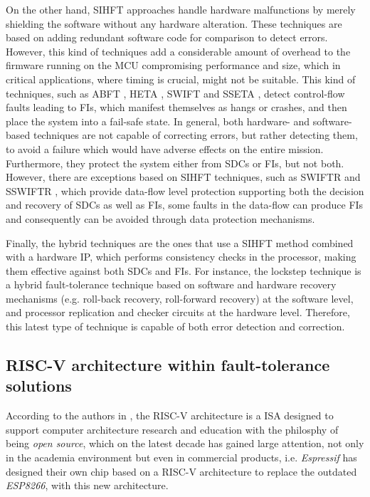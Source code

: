 \documentclass[10pt, a4paper]{report}
\begin{document}
On the other hand, \acrfull{SIHFT} approaches handle hardware malfunctions by
merely shielding the software without any hardware alteration. These techniques
are based on adding redundant software code for comparison to detect errors.
However, this kind of techniques add a considerable amount of overhead to the
firmware running on the \acrshort{MCU} compromising performance and size, which 
in critical applications, where timing is crucial, might not be suitable. This
kind of techniques, such as \acrfull{ABFT} \cite{abft_huang}, \acrfull{HETA}
\cite{heta_paper}, \acrfull{SWIFT} \cite{swift_paper} and \acrfull{SSETA} 
\cite{sseta_paper}, detect control-flow faults leading to \acrshort{FI}s, which 
manifest themselves as hangs or crashes, and then place the system into a 
fail-safe state. In general, both hardware- and software-based techniques are 
not capable of correcting errors, but rather detecting them, to avoid a failure 
which would have adverse effects on the entire mission. Furthermore, they 
protect the system either from \acrshort{SDC}s or \acrshort{FI}s, but not both. 
However, there are exceptions based on \acrfull{SIHFT} techniques, such 
as \acrfull{SWIFTR} \cite{swiftr_paper} and \acrfull{SSWIFTR} 
\cite{sswiftr_paper}, which provide data-flow level protection supporting both 
the decision and recovery of \acrshort{SDC}s as well as \acrshort{FI}s, some 
faults in the data-flow can produce \acrshort{FI}s and consequently can be 
avoided through data protection mechanisms.

Finally, the hybrid techniques are the ones that use a \acrshort{SIHFT} method
combined with a hardware \acrshort{IP}, which performs consistency checks in the
processor, making them effective against both \acrshort{SDC}s and
\acrshort{FI}s. For instance, the lockstep technique is a hybrid fault-tolerance
technique based on software and hardware recovery mechanisms (e.g. roll-back
recovery, roll-forward recovery) at the software level, and processor
replication and checker circuits at the hardware level. Therefore, this latest
type of technique is capable of both error detection and correction.

\subsection{RISC-V architecture within fault-tolerance solutions}

According to the authors in \cite{riscv_paper}, the RISC-V architecture is a 
\acrfull{ISA} designed to support computer architecture research and 
education with the philosphy of being \emph{open source}, which on the latest 
decade has gained large attention, not only in the academia environment but even 
in commercial products, i.e. \emph{Espressif} has designed their own chip based 
on a RISC-V architecture to replace the outdated \emph{ESP8266}, with this new 
architecture.
\end{document}
